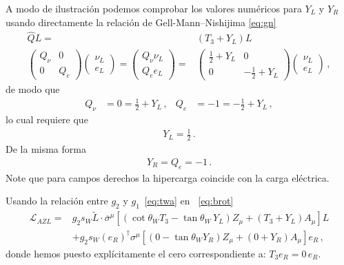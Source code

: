 A modo de ilustración podemos comprobar
los valores numéricos para $Y_L$ y $Y_R$ usando directamente la relación de Gell-Mann--Nishijima \eqref{eq:gn}
\begin{align}
  \widehat{Q}L=&(T_3+Y_L)L \nonumber\\
  \begin{pmatrix}
    Q_\nu & 0\\
    0  & Q_e
  \end{pmatrix}
  \begin{pmatrix}
    \nu_L\\
    e_L
  \end{pmatrix}=  
  \begin{pmatrix}
   Q_{\nu} \nu_L\\
   Q_e e_L
  \end{pmatrix}
= & \begin{pmatrix}
    \frac{1}{2} + Y_L & 0\\
    0  & -\frac{1}{2}+Y_L
  \end{pmatrix}  \begin{pmatrix}
    \nu_L\\
    e_L
  \end{pmatrix} \,,
\end{align}
de modo que
\begin{align}
  Q_{\nu}&=0=\frac{1}{2}+Y_L\,, & Q_e&=-1=-\frac{1}{2}+Y_L\,,
\end{align}
lo cual  requiere que
\begin{align}
  Y_L=\frac{1}{2}\,.
\end{align}
De la misma forma
\begin{align}
  Y_R=Q_e=-1\,.
\end{align}
Note que para campos derechos la hipercarga coincide con la carga eléctrica.


Usando la relación entre $g_2$ y ${g_1}$~\eqref{eq:twa} en ~\eqref{eq:brot}
\begin{align}
    \mathcal{L}_{A Z L}
=&g_2 s_W \widetilde{L}\cdot\overline{\sigma}^\mu\left[\left(\cot\theta_WT_3- \tan\theta_W\,Y_L\right)Z_\mu
       +\left(T_3+Y_L\right) A_\mu\right]L \nonumber\\
&+g_2 s_W \left(e_R \right)^{\dagger}\sigma^\mu \left[ \left(0 -\tan\theta_W  Y_R  \right) Z_{\mu}  +\left( 0+ Y_R \right)  A_{\mu} \right]{e_R}\,,
\end{align}
donde hemos puesto explícitamente el cero correspondiente a: $T_3 e_R= 0 \,e_R$.

